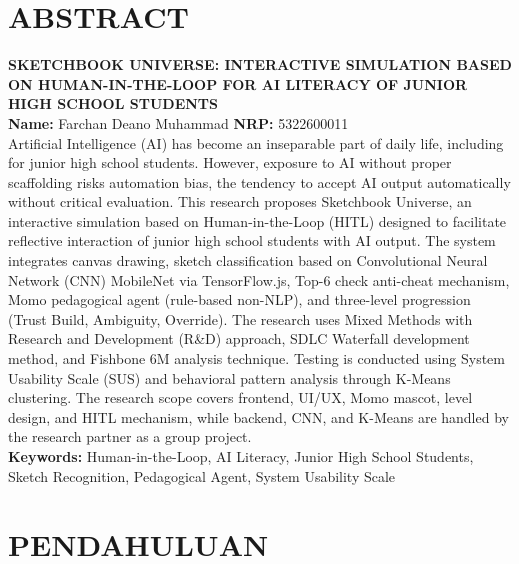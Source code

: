 \documentclass[12pt,a4paper,oneside,openany]{report}
\begin{document}
\chapter*{ABSTRACT}
\thispagestyle{empty}
\textbf{SKETCHBOOK UNIVERSE: INTERACTIVE SIMULATION BASED ON HUMAN-IN-THE-LOOP FOR AI LITERACY OF JUNIOR HIGH SCHOOL STUDENTS}\\[0.5cm]
\textbf{Name:} Farchan Deano Muhammad \quad \textbf{NRP:} 5322600011\\[1cm]
Artificial Intelligence (AI) has become an inseparable part of daily life, including for junior high school students. However, exposure to AI without proper scaffolding risks automation bias, the tendency to accept AI output automatically without critical evaluation. This research proposes Sketchbook Universe, an interactive simulation based on Human-in-the-Loop (HITL) designed to facilitate reflective interaction of junior high school students with AI output. The system integrates canvas drawing, sketch classification based on Convolutional Neural Network (CNN) MobileNet via TensorFlow.js, Top-6 check anti-cheat mechanism, Momo pedagogical agent (rule-based non-NLP), and three-level progression (Trust Build, Ambiguity, Override). The research uses Mixed Methods with Research and Development (R\&D) approach, SDLC Waterfall development method, and Fishbone 6M analysis technique. Testing is conducted using System Usability Scale (SUS) and behavioral pattern analysis through K-Means clustering. The research scope covers frontend, UI/UX, Momo mascot, level design, and HITL mechanism, while backend, CNN, and K-Means are handled by the research partner as a group project.\\[1cm]
\textbf{Keywords:} Human-in-the-Loop, AI Literacy, Junior High School Students, Sketch Recognition, Pedagogical Agent, System Usability Scale
\newpage

\tableofcontents
\newpage

\listoffigures
{}
\newpage

\listoftables
{}
\newpage

\clearpage


\chapter{PENDAHULUAN}
\label{chap:bab1}
\end{document}
